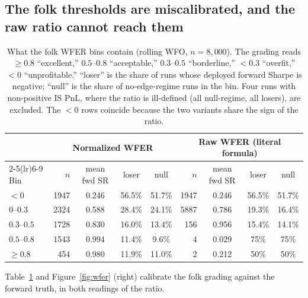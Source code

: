 \documentclass[11pt]{article}
\begin{document}
\subsection{The folk thresholds are miscalibrated, and the raw ratio cannot
reach them}
\label{sec:thresholds}

\begin{table}[t]
\centering
\caption{What the folk WFER bins contain (rolling WFO, $n=8{,}000$). The
grading reads $\ge 0.8$ ``excellent,'' $0.5$--$0.8$ ``acceptable,''
$0.3$--$0.5$ ``borderline,'' $<0.3$ ``overfit,'' $<0$ ``unprofitable.''
``loser'' is the share of runs whose deployed forward Sharpe is negative;
``null'' is the share of no-edge-regime runs in the bin. Four runs with
non-positive IS PnL, where the ratio is ill-defined (all null-regime, all
losers), are excluded. The $<0$ rows coincide because the two variants share
the sign of the ratio.}
\label{tab:bins}
\small
\begin{tabular}{lrccc@{\hskip 1.8em}rccc}
\toprule
& \multicolumn{4}{c}{Normalized WFER} & \multicolumn{4}{c}{Raw WFER (literal formula)} \\
\cmidrule(lr){2-5}\cmidrule(lr){6-9}
Bin & $n$ & mean fwd SR & loser & null & $n$ & mean fwd SR & loser & null \\
\midrule
$<0$         & 1947 & 0.246 & 56.5\% & 51.7\% & 1947 & 0.246 & 56.5\% & 51.7\% \\
$0$--$0.3$   & 2324 & 0.588 & 28.4\% & 24.1\% & 5887 & 0.786 & 19.3\% & 16.4\% \\
$0.3$--$0.5$ & 1728 & 0.830 & 16.0\% & 13.4\% &  156 & 0.956 & 15.4\% & 14.1\% \\
$0.5$--$0.8$ & 1543 & 0.994 & 11.4\% & \phantom{0}9.6\% & 4 & 0.029 & 75\% & 75\% \\
$\geq 0.8$   &  454 & 0.980 & 11.9\% & 11.0\% & 2 & 0.212 & 50\% & 50\% \\
\bottomrule
\end{tabular}
\end{table}

Table~\ref{tab:bins} and Figure~\ref{fig:wfer} (right) calibrate the folk
grading against the forward truth, in both readings of the ratio.
\end{document}
